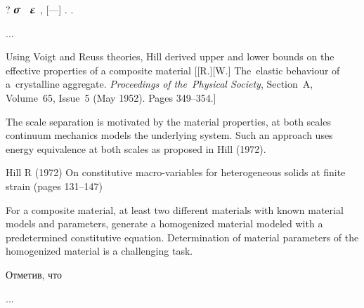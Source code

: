 \label{section:composites.boundaryvalueproblems}

   ?
    ${\hspace{-0.1ex}\linearstress\hspace{.1ex}}$ ~$\infinitesimaldeformation$ ,     [---]    .
\en{,}    .

...



\label{section:composites.hillsfork}

\begin{otherlanguage}{russian}

{\small
\noindent
Using Voigt and Reuss theories, Hill derived upper and lower bounds on the effective properties of a composite material [[R.][W.] The~elastic behaviour of a~crystalline aggregate. \emph{Proceedings of the~Physical Society}, Section~A, Volume~65, Issue~5 (May 1952). Pages 349\hbox{--}354.]

The scale separation is motivated by the material properties, at both scales continuum mechanics models the underlying system.
Such an approach uses energy equivalence at both scales as proposed in Hill (1972).

Hill R (1972) On constitutive macro-variables for heterogeneous solids at finite strain (pages 131–147)

For a composite material, at least two different materials with known material models and parameters, generate a homogenized material modeled with a predetermined constitutive equation. Determination of material parameters of the homogenized material is a challenging task.
\par}

Отметив, что

...



\end{otherlanguage}

